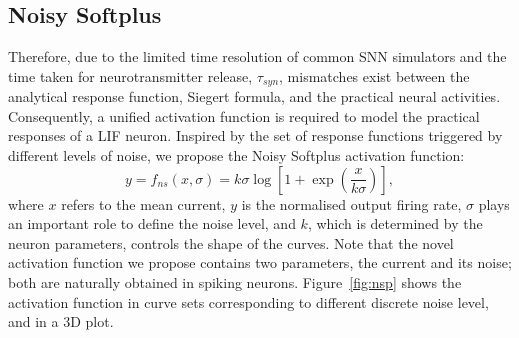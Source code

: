 	

		
	\subsection{Noisy Softplus}
	Therefore, due to the limited time resolution of common SNN simulators and the time taken for neurotransmitter release, $\tau_{syn}$, mismatches exist between the analytical response function, Siegert formula, and the practical neural activities.
	Consequently, a unified activation function is required to model the practical responses of a LIF neuron.
	Inspired by the set of response functions triggered by different levels of noise, we propose the Noisy Softplus activation function:
	\begin{equation}
	y = f_{ns}(x, \sigma) = k \sigma \log [1 + \exp(\frac{x}{k \sigma})],
	\label{equ:nsp}
	\end{equation}
	where $x$ refers to the mean current, $y$ is the normalised output firing rate, $\sigma$ plays an important role to define the noise level, and $k$, which is determined by the neuron parameters, controls the shape of the curves.
	Note that the novel activation function we propose contains two parameters, the current and its noise; both are naturally obtained in spiking neurons.
	Figure~\ref{fig:nsp} shows the activation function in curve sets corresponding to different discrete noise level, and in a 3D plot.
